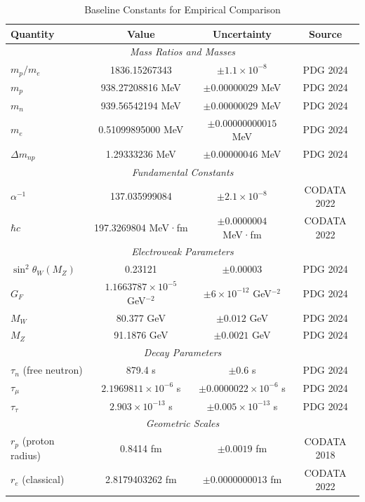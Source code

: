 
\begin{table}[h]
\caption{Baseline Constants for Empirical Comparison}
\label{tab:baseline_constants}
\centering
\begin{tabular}{lccc}
\hline
\textbf{Quantity} & \textbf{Value} & \textbf{Uncertainty} & \textbf{Source} \\
\hline
\multicolumn{4}{c}{\textit{Mass Ratios and Masses}} \\
\hline
$m_p/m_e$ & 1836.15267343 & $\pm 1.1 \times 10^{-8}$ & PDG 2024 \\
$m_p$ & 938.27208816 MeV & $\pm 0.00000029$ MeV & PDG 2024 \\
$m_n$ & 939.56542194 MeV & $\pm 0.00000029$ MeV & PDG 2024 \\
$m_e$ & 0.51099895000 MeV & $\pm 0.00000000015$ MeV & PDG 2024 \\
$\Delta m_{np}$ & 1.29333236 MeV & $\pm 0.00000046$ MeV & PDG 2024 \\
\hline
\multicolumn{4}{c}{\textit{Fundamental Constants}} \\
\hline
$\alpha^{-1}$ & 137.035999084 & $\pm 2.1 \times 10^{-8}$ & CODATA 2022 \\
$\hbar c$ & 197.3269804 MeV·fm & $\pm 0.0000004$ MeV·fm & CODATA 2022 \\
\hline
\multicolumn{4}{c}{\textit{Electroweak Parameters}} \\
\hline
$\sin^2\theta_W(M_Z)$ & 0.23121 & $\pm 0.00003$ & PDG 2024 \\
$G_F$ & $1.1663787 \times 10^{-5}$ GeV$^{-2}$ & $\pm 6 \times 10^{-12}$ GeV$^{-2}$ & PDG 2024 \\
$M_W$ & 80.377 GeV & $\pm 0.012$ GeV & PDG 2024 \\
$M_Z$ & 91.1876 GeV & $\pm 0.0021$ GeV & PDG 2024 \\
\hline
\multicolumn{4}{c}{\textit{Decay Parameters}} \\
\hline
$\tau_n$ (free neutron) & 879.4 s & $\pm 0.6$ s & PDG 2024 \\
$\tau_\mu$ & $2.1969811 \times 10^{-6}$ s & $\pm 0.0000022 \times 10^{-6}$ s & PDG 2024 \\
$\tau_\tau$ & $2.903 \times 10^{-13}$ s & $\pm 0.005 \times 10^{-13}$ s & PDG 2024 \\
\hline
\multicolumn{4}{c}{\textit{Geometric Scales}} \\
\hline
$r_p$ (proton radius) & 0.8414 fm & $\pm 0.0019$ fm & CODATA 2018 \\
$r_e$ (classical) & 2.8179403262 fm & $\pm 0.0000000013$ fm & CODATA 2022 \\
\hline
\end{tabular}
\end{table}

